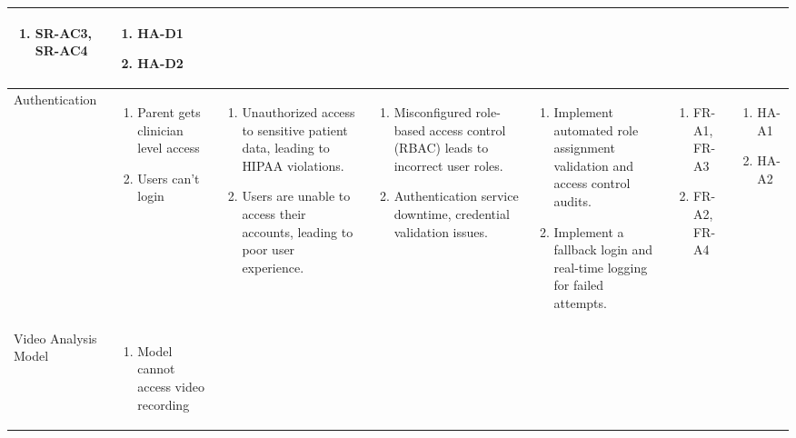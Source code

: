 \documentclass{article}
\begin{document}
\begin{landscape}
\begin{longtable}{|p{3cm}|p{3cm}|p{4cm}|p{4cm}|p{3cm}|p{2cm}|p{3cm}|}
\begin{enumerate}[leftmargin=*]
       \item SR-AC3, SR-AC4
  \end{enumerate} &
  \begin{enumerate}[leftmargin=*]
       \item HA-D1
       \item HA-D2
  \end{enumerate} \\
  \hline
  Authentication & 
  \begin{enumerate}[leftmargin=*]
      \item Parent gets clinician level access
      \item Users can't login
  \end{enumerate} & 
  \begin{enumerate}[leftmargin=*]
      \item Unauthorized access to sensitive patient data, leading to HIPAA violations.
      \item Users are unable to access their accounts, leading to poor user experience.
  \end{enumerate} &
  \begin{enumerate}[leftmargin=*]
       \item Misconfigured role-based access control (RBAC) leads to incorrect user roles.
       \item Authentication service downtime, credential validation issues.
  \end{enumerate} &
  \begin{enumerate}[leftmargin=*]
       \item Implement automated role assignment validation and access control audits.
       \item Implement a fallback login and real-time logging for failed attempts.
  \end{enumerate} &
  \begin{enumerate}[leftmargin=*]
       \item FR-A1, FR-A3
       \item FR-A2, FR-A4
  \end{enumerate} &
  \begin{enumerate}[leftmargin=*]
       \item HA-A1
       \item HA-A2
  \end{enumerate} \\
  \hline
  Video Analysis Model & 
  \begin{enumerate}[leftmargin=*]
      \item Model cannot access video recording

\end{enumerate}
\end{longtable}
\end{landscape}
\end{document}
